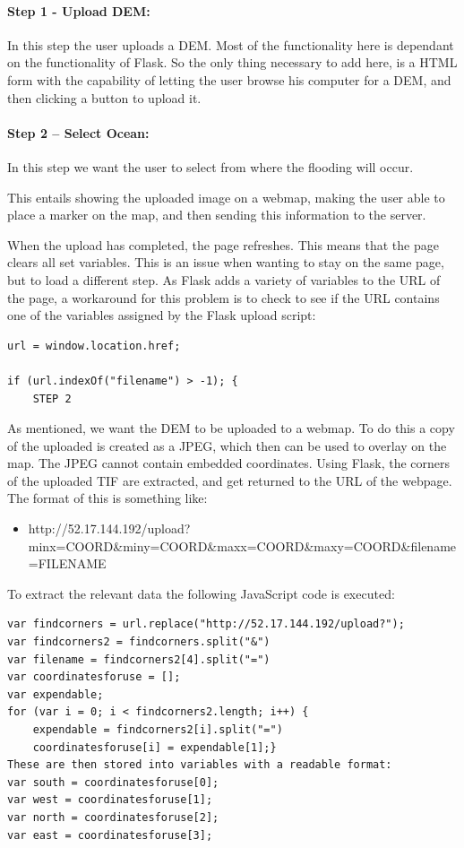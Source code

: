 \paragraph{Step 1 - Upload DEM:}
In this step the user uploads a DEM. Most of the functionality here is dependant on the functionality of Flask. So the only thing necessary to add here, is a HTML form with the capability of letting the user browse his computer for a DEM, and then clicking a button to upload it. \\

\paragraph{Step 2 – Select Ocean:}
In this step we want the user to select from where the flooding will occur. 

This entails showing the uploaded image on a webmap, making the user able to place a marker on the map, and then sending this information to the server.

When the upload has completed, the page refreshes. This means that the page clears all set variables. This is an issue when wanting to stay on the same page, but to load a different step. As Flask adds a variety of variables to the URL of the page, a workaround for this problem is to check to see if the URL contains  one  of the variables assigned by the Flask upload script:

\begin{lstlisting}
url = window.location.href;

if (url.indexOf("filename") > -1); {
	STEP 2

\end{lstlisting}

As mentioned, we want the DEM to be uploaded to a webmap. To do this a copy of the uploaded is created as a JPEG, which then can be used to overlay on the map. The JPEG cannot contain embedded coordinates. Using Flask, the corners of the uploaded TIF are extracted, and get returned to the URL of the webpage.
The format of this is something like:

\begin{itemize}
\item http://52.17.144.192/upload?minx=COORD\&miny=COORD\&maxx=COORD\&maxy=COORD\&filename=FILENAME
\end{itemize}

To extract the relevant data the following JavaScript code is executed:

\begin{lstlisting}
var findcorners = url.replace("http://52.17.144.192/upload?");
var findcorners2 = findcorners.split("&")
var filename = findcorners2[4].split("=")
var coordinatesforuse = [];
var expendable;
for (var i = 0; i < findcorners2.length; i++) {
    expendable = findcorners2[i].split("=")
    coordinatesforuse[i] = expendable[1];}
These are then stored into variables with a readable format:
var south = coordinatesforuse[0];
var west = coordinatesforuse[1];
var north = coordinatesforuse[2];
var east = coordinatesforuse[3];

\end{lstlisting}

